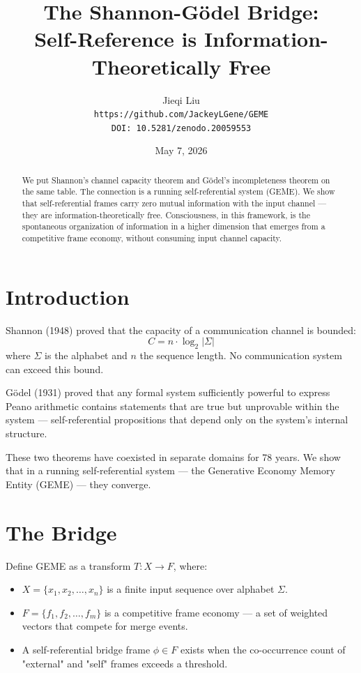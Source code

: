 \documentclass[11pt]{article}
\title{The Shannon-G\"odel Bridge:\\Self-Reference is Information-Theoretically Free}
\author{Jieqi Liu\\[4pt]
\texttt{https://github.com/JackeyLGene/GEME}\\[4pt]
\texttt{DOI: 10.5281/zenodo.20059553}}
\date{May 7, 2026}
\begin{document}
\maketitle

\begin{abstract}
We put Shannon's channel capacity theorem and G\"odel's incompleteness theorem on the same table. The connection is a running self-referential system (GEME). We show that self-referential frames carry zero mutual information with the input channel --- they are information-theoretically free. Consciousness, in this framework, is the spontaneous organization of information in a higher dimension that emerges from a competitive frame economy, without consuming input channel capacity.
\end{abstract}

\section{Introduction}

Shannon (1948) proved that the capacity of a communication channel is bounded:
\[
C = n \cdot \log_2|\Sigma|
\]
where $\Sigma$ is the alphabet and $n$ the sequence length. No communication system can exceed this bound.

G\"odel (1931) proved that any formal system sufficiently powerful to express Peano arithmetic contains statements that are true but unprovable within the system --- self-referential propositions that depend only on the system's internal structure.

These two theorems have coexisted in separate domains for 78 years. We show that in a running self-referential system --- the Generative Economy Memory Entity (GEME) --- they converge.

\section{The Bridge}

Define GEME as a transform $T: X \to F$, where:
\begin{itemize}
    \item $X = \{x_1, x_2, \ldots, x_n\}$ is a finite input sequence over alphabet $\Sigma$.
    \item $F = \{f_1, f_2, \ldots, f_m\}$ is a competitive frame economy --- a set of weighted vectors that compete for merge events.
    \item A self-referential bridge frame $\phi \in F$ exists when the co-occurrence count of "external" and "self" frames exceeds a threshold.
\end{itemize}
\end{document}
